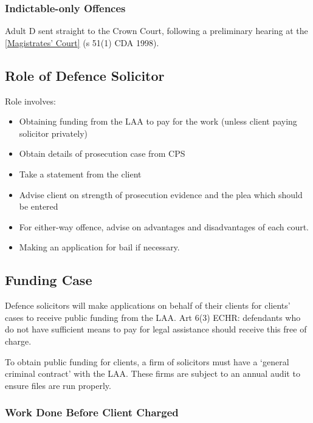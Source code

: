 \documentclass[
]{article}
\providecommand{\tightlist}{%
  \setlength{\itemsep}{0pt}\setlength{\parskip}{0pt}}
\begin{document}
\hypertarget{indictable-only-offences}{%
\subsubsection{Indictable-only
Offences}\label{indictable-only-offences}}

Adult D sent straight to the Crown Court, following a preliminary
hearing at the
\href{maximum\%20compensation\%20of\%20£5,000\%20per\%20offence}{{[}Magistrates'
Court{]}} (s 51(1) CDA 1998).

\hypertarget{role-of-defence-solicitor}{%
\subsection{Role of Defence Solicitor}\label{role-of-defence-solicitor}}

Role involves:

\begin{itemize}
\tightlist
\item
  Obtaining funding from the LAA to pay for the work (unless client
  paying solicitor privately)
\item
  Obtain details of prosecution case from CPS
\item
  Take a statement from the client
\item
  Advise client on strength of prosecution evidence and the plea which
  should be entered
\item
  For either-way offence, advise on advantages and disadvantages of each
  court.
\item
  Making an application for bail if necessary.
\end{itemize}

\hypertarget{funding-case}{%
\subsection{Funding Case}\label{funding-case}}

Defence solicitors will make applications on behalf of their clients for
clients' cases to receive public funding from the LAA. Art 6(3) ECHR:
defendants who do not have sufficient means to pay for legal assistance
should receive this free of charge.

To obtain public funding for clients, a firm of solicitors must have a
`general criminal contract' with the LAA. These firms are subject to an
annual audit to ensure files are run properly.

\hypertarget{work-done-before-client-charged}{%
\subsubsection{Work Done Before Client
Charged}\label{work-done-before-client-charged}}
\end{document}
